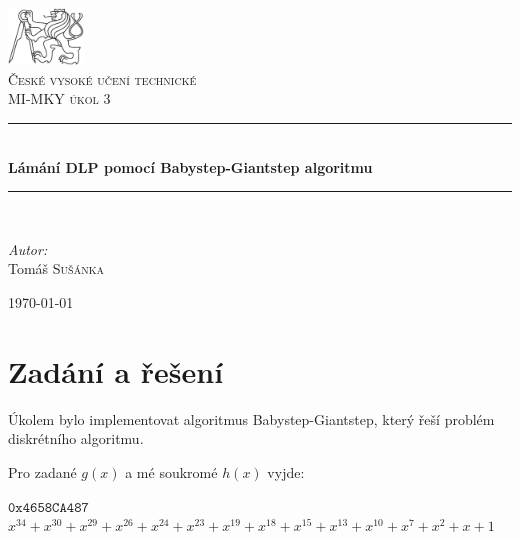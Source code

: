 \documentclass[czech,a4paper,11pt]{article}
\newcommand{\HRule}{\rule{\linewidth}{0.5mm}}
\begin{document}
\begin{titlepage}
\begin{center}

\includegraphics[width=0.15\textwidth]{./cvut-logo-bw.pdf}~\\[1cm]

\textsc{\LARGE České vysoké učení technické }\\[1.5cm]

\textsc{\Large MI-MKY úkol 3}\\[0.5cm]

\HRule \\[0.4cm]
{ \huge \bfseries Lámání DLP pomocí Babystep-Giantstep algoritmu \\[0.4cm] }

\HRule \\[1.5cm]

\begin{minipage}{0.4\textwidth}
\begin{flushleft} \large
\emph{Autor:}\\
Tomáš \textsc{Sušánka}
\end{flushleft}
\end{minipage}

\vfill

{\large \today}

\end{center}
\end{titlepage}


\newpage
\tableofcontents

\newpage
\section{Zadání a řešení}
Úkolem bylo implementovat algoritmus Babystep-Giantstep, který řeší problém diskrétního algoritmu.

Pro zadané $g(x)$ a mé soukromé $h(x)$ vyjde:

\begin{table}[h!]
  \begin{center}
	$\texttt{0x4658CA487}$
	$x^{34}+x^{30}+x^{29}+x^{26}+x^{24}+x^{23}+x^{19}+x^{18}+x^{15}+x^{13}+x^{10}+x^7+x^2+x+1$
  \end{center}
\end{table}
\end{document}
